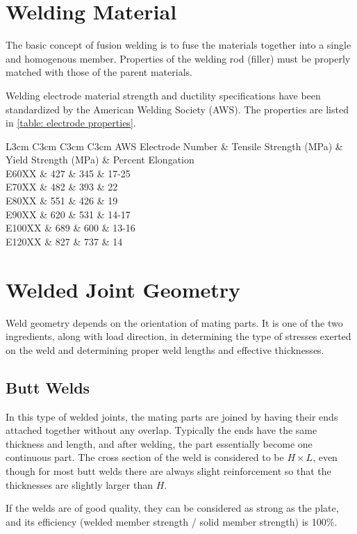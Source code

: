 \documentclass[a4paper,openany,12pt]{book}
\begin{document}
{{\section{Welding Material}
\label{welding-material}
The basic concept of fusion welding is to fuse the materials together
into a single and homogenous member. Properties of the welding rod
(filler) must be properly matched with those of the parent materials.

Welding electrode material strength and ductility specifications have
been standardized by the American Welding Society (AWS). The properties
are listed in \ref{table: electrode properties}.


 L3cm C3cm C3cm C3cm AWS Electrode Number \& Tensile Strength (MPa) \&
Yield Strength (MPa) \& Percent Elongation\\
E60XX \& 427 \& 345 \& 17-25\\
E70XX \& 482 \& 393 \& 22\\
E80XX \& 551 \& 426 \& 19\\
E90XX \& 620 \& 531 \& 14-17\\
E100XX \& 689 \& 600 \& 13-16\\
E120XX \& 827 \& 737 \& 14\\

\section{Welded Joint Geometry}
\label{welded-joint-geometry}
Weld geometry depends on the orientation of mating parts. It is one of
the two ingredients, along with load direction, in determining the type
of stresses exerted on the weld and determining proper weld lengths and
effective thicknesses.

\subsection{Butt Welds}
\label{butt-welds}
In this type of welded joints, the mating parts are joined by having
their ends attached together without any overlap. Typically the ends
have the same thickness and length, and after welding, the part
essentially become one continuous part. The cross section of the weld is
considered to be \(H \times L\), even though for most butt welds there are
always slight reinforcement so that the thicknesses are slightly larger
than \(H\).


If the welds are of good quality, they can be considered as strong as
the plate, and its efficiency (welded member strength / solid member
strength) is 100\%.

}}
\end{document}
